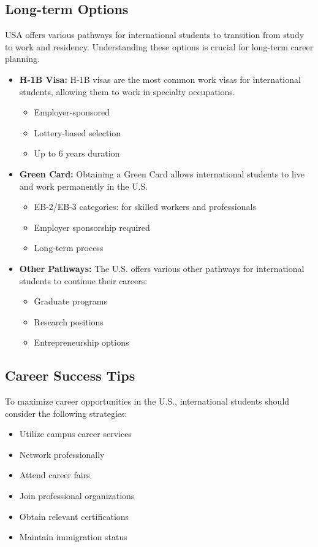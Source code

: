 \subsection{Long-term Options}
USA offers various pathways for international students to transition from study to work and residency. Understanding these options is crucial for long-term career planning.
\begin{itemize}
    \item \textbf{H-1B Visa:} H-1B visas are the most common work visas for international students, allowing them to work in specialty occupations.
    \begin{itemize}
        \item Employer-sponsored
        \item Lottery-based selection
        \item Up to 6 years duration
    \end{itemize}
    
    \item \textbf{Green Card:} Obtaining a Green Card allows international students to live and work permanently in the U.S.
    \begin{itemize}
        \item EB-2/EB-3 categories: for skilled workers and professionals
        \item Employer sponsorship required
        \item Long-term process
    \end{itemize}
    
    \item \textbf{Other Pathways:} The U.S. offers various other pathways for international students to continue their careers:
    \begin{itemize}
        \item Graduate programs
        \item Research positions
        \item Entrepreneurship options
    \end{itemize}
\end{itemize}

\subsection{Career Success Tips}
To maximize career opportunities in the U.S., international students should consider the following strategies:
\begin{itemize}
    \item Utilize campus career services
    \item Network professionally
    \item Attend career fairs
    \item Join professional organizations
    \item Obtain relevant certifications
    \item Maintain immigration status
\end{itemize}

